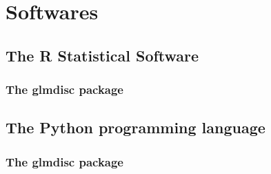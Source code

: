 \chapter{Softwares}


\section{The R Statistical Software}




\subsection{The glmdisc package}





\section{The Python programming language}




\subsection{The glmdisc package}




